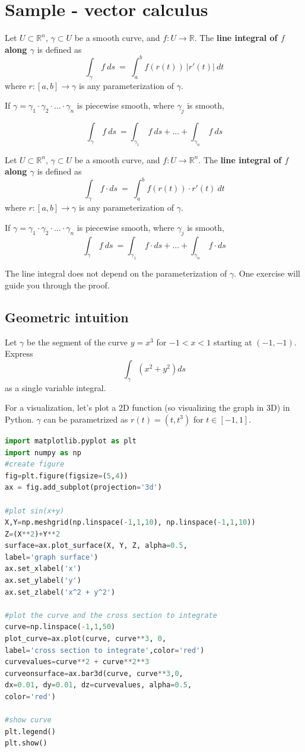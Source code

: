 \documentclass[11pt,openany]{book}
\newcommand{\definition}[2]{\begin{tcolorbox}[title=Definition ({#1}),colframe=black]{#2}\end{tcolorbox}
}
\newcommand{\example}[1]{\begin{tcolorbox}[title=Example,colframe=yellow!50!white,colback=yellow!20!white,coltitle=black]{#1}\end{tcolorbox}
}
\begin{document}
	
	\chapter{Sample - vector calculus}
	
	
	\definition{Line Integral - scalar}{
		Let $U \subset \mathbb{R}^n$, $\gamma \subset U$ be a smooth curve, and $f: U \to \mathbb{R}$. The \textbf{line integral of $f$ along $\gamma$} is defined as
		\[
		\int_\gamma \ f \ ds \ = \ \int_a^b f(r(t)) \ |r'(t)| \ dt
		\]
		where $r : [a,b] \to \gamma$ is any parameterization of $\gamma$.

		If $\gamma =  \gamma_1 \cdot \gamma_2 \cdot ... \cdot \gamma_n  $ is piecewise smooth, where $\gamma_j$ is smooth,

		\[
		\int_\gamma \ f \ ds \ = \int_{\gamma_1} \ f \ ds + ... + \int_{\gamma_n} \ f \ ds
		\]
	}
	\definition{Line Integral - vector}{
		Let $U \subset \mathbb{R}^n$, $\gamma \subset U$ be a smooth curve, and $f: U \to \mathbb{R}^n$. The \textbf{line integral of $f$ along $\gamma$} is defined as
		\[
		\int_\gamma \ f  \cdot ds \ = \ \int_a^b f(r(t)) \cdot r'(t)  \ dt
		\]
		where $r : [a,b] \to \gamma$ is any parameterization of $\gamma$.

		If $\gamma =  \gamma_1 \cdot \gamma_2 \cdot ... \cdot \gamma_n  $ is piecewise smooth, where $\gamma_j$ is smooth,
		\[
		\int_\gamma \ f \ ds \ = \int_{\gamma_1} \ f \cdot ds + ... + \int_{\gamma_n} \ f \cdot ds
		\]
	}

	The line integral does not depend on the parameterization of $\gamma$. One exercise will guide you through the proof.
	\section*{Geometric intuition}
	\example{
		Let $\gamma$ be the segment of the curve $y=x^3$ for $-1<x<1$ starting at $(-1,-1)$.
		Express 
		\[
		\int_{\gamma} (x^2 +y^2) ds
		\]
		as a single variable integral.
	}
	For a visualization, let's plot a 2D function (so visualizing the graph in 3D) in Python. $\gamma$ can be parametrized as $r(t) = (t,t^3)$ for $t\in[-1,1]$.
	\begin{lstlisting}[language=Python]
import matplotlib.pyplot as plt
import numpy as np
#create figure
fig=plt.figure(figsize=(5,4))
ax = fig.add_subplot(projection='3d')

#plot sin(x+y)
X,Y=np.meshgrid(np.linspace(-1,1,10), np.linspace(-1,1,10))
Z=(X**2)+Y**2
surface=ax.plot_surface(X, Y, Z, alpha=0.5,
label='graph surface')
ax.set_xlabel('x')
ax.set_ylabel('y')
ax.set_zlabel('x^2 + y^2')

#plot the curve and the cross section to integrate
curve=np.linspace(-1,1,50)
plot_curve=ax.plot(curve, curve**3, 0,
label='cross section to integrate',color='red')
curvevalues=curve**2 + curve**2**3
curveonsurface=ax.bar3d(curve, curve**3,0,
dx=0.01, dy=0.01, dz=curvevalues, alpha=0.5,
color='red')

#show curve
plt.legend()
plt.show()
	\end{lstlisting}
\end{document}
